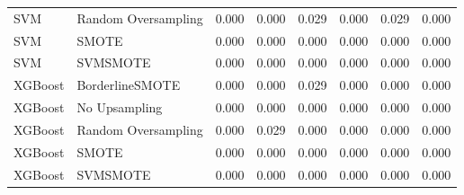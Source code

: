 \begin{tabular}{llllllll}
                         SVM & Random Oversampling & 0.000 &                     0.000 &                 0.029 &                  0.000 &                                   0.029 &     0.000 \\
                         SVM &               SMOTE & 0.000 &                     0.000 &                 0.000 &                  0.000 &                                   0.000 &     0.000 \\
                         SVM &            SVMSMOTE & 0.000 &                     0.000 &                 0.000 &                  0.000 &                                   0.000 &     0.000 \\
                     XGBoost &     BorderlineSMOTE & 0.000 &                     0.000 &                 0.029 &                  0.000 &                                   0.000 &     0.000 \\
                     XGBoost &       No Upsampling & 0.000 &                     0.000 &                 0.000 &                  0.000 &                                   0.000 &     0.000 \\
                     XGBoost & Random Oversampling & 0.000 &                     0.029 &                 0.000 &                  0.000 &                                   0.000 &     0.000 \\
                     XGBoost &               SMOTE & 0.000 &                     0.000 &                 0.000 &                  0.000 &                                   0.000 &     0.000 \\
                     XGBoost &            SVMSMOTE & 0.000 &                     0.000 &                 0.000 &                  0.000 &                                   0.000 &     0.000 \\
\bottomrule
\end{tabular}
